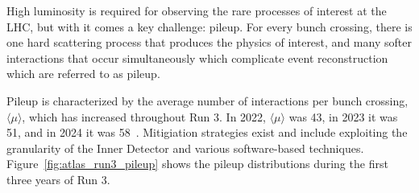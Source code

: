 


High luminosity is required for observing the rare processes of interest at the LHC, but with it comes a key challenge: pileup. For every bunch crossing, there is one hard scattering process that produces the physics of interest, and many softer interactions that occur simultaneously which complicate event reconstruction which are referred to as pileup.

Pileup is characterized by the average number of interactions per bunch crossing, $\langle \mu \rangle$, which has increased throughout Run 3. In 2022, $\langle \mu \rangle$ was 43, in 2023 it was 51, and in 2024 it was 58~\cite{atlas_pileup_image}. Mitigiation strategies exist and include exploiting the granularity of the Inner Detector and various software-based techniques. Figure~\ref{fig:atlas_run3_pileup} shows the pileup distributions during the first three years of Run 3.


